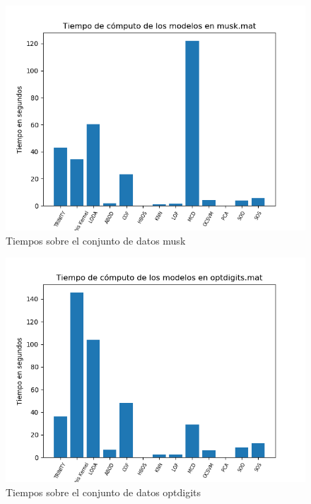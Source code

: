 \begin{figure}[H]
	\centering
	\includegraphics[scale=0.7]{imagenes/imgs-exp1/times/musk}
	\caption{Tiempos sobre el conjunto de datos musk}
	\label{musk_times}
\end{figure}

\begin{figure}[H]
	\centering
	\includegraphics[scale=0.7]{imagenes/imgs-exp1/times/optdigits}
	\caption{Tiempos sobre el conjunto de datos optdigits}
	\label{optdigits_times}
\end{figure}

